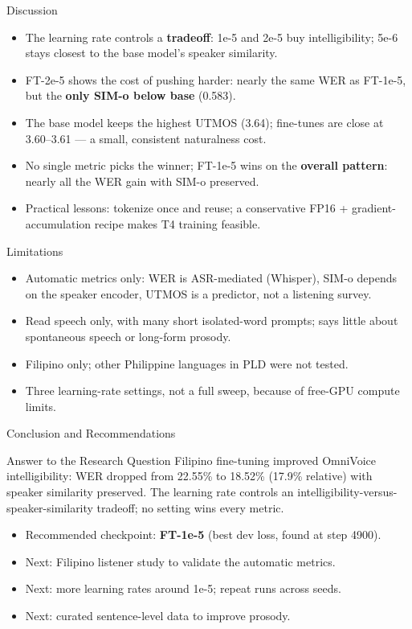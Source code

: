\documentclass[aspectratio=169]{beamer}
\begin{document}
\begin{frame}{Discussion}
  \begin{itemize}
    \item The learning rate controls a \textbf{tradeoff}: 1e-5 and 2e-5 buy intelligibility; 5e-6 stays closest to the base model's speaker similarity.
    \item FT-2e-5 shows the cost of pushing harder: nearly the same WER as FT-1e-5, but the \textbf{only SIM-o below base} (0.583).
    \item The base model keeps the highest UTMOS (3.64); fine-tunes are close at 3.60--3.61 --- a small, consistent naturalness cost.
    \item No single metric picks the winner; FT-1e-5 wins on the \textbf{overall pattern}: nearly all the WER gain with SIM-o preserved.
    \item Practical lessons: tokenize once and reuse; a conservative FP16 + gradient-accumulation recipe makes T4 training feasible.
  \end{itemize}
\end{frame}

\begin{frame}{Limitations}
  \begin{itemize}
    \item Automatic metrics only: WER is ASR-mediated (Whisper), SIM-o depends on the speaker encoder, UTMOS is a predictor, not a listening survey.
    \item Read speech only, with many short isolated-word prompts; says little about spontaneous speech or long-form prosody.
    \item Filipino only; other Philippine languages in PLD were not tested.
    \item Three learning-rate settings, not a full sweep, because of free-GPU compute limits.
  \end{itemize}
\end{frame}

\begin{frame}{Conclusion and Recommendations}
  \begin{block}{Answer to the Research Question}
    Filipino fine-tuning improved OmniVoice intelligibility: WER dropped from 22.55\% to 18.52\% (17.9\% relative) with speaker similarity preserved. The learning rate controls an intelligibility-versus-speaker-similarity tradeoff; no setting wins every metric.
  \end{block}

  \vspace{0.5em}

  \begin{itemize}
    \item Recommended checkpoint: \textbf{FT-1e-5} (best dev loss, found at step 4900).
    \item Next: Filipino listener study to validate the automatic metrics.
    \item Next: more learning rates around 1e-5; repeat runs across seeds.
    \item Next: curated sentence-level data to improve prosody.
  \end{itemize}
\end{frame}
\end{document}
